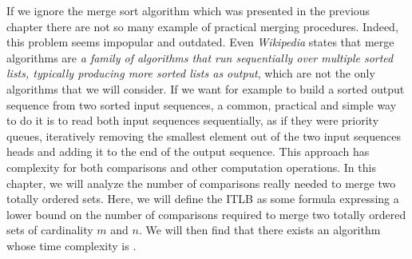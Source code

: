 \label{tree:merging:intro}

If we ignore the merge sort algorithm which was presented in
the previous chapter there are not so many example of practical merging
procedures. Indeed, this problem seems impopular and outdated. Even
\emph{Wikipedia} states that merge algorithms are \emph{a family of algorithms
that run sequentially over multiple sorted lists, typically producing more
sorted lists as output}, which are not the only algorithms that we will
consider. If we want for example to build a sorted output sequence from two
sorted input sequences, a common, practical and simple way to do it is to read
both input sequences sequentially, as if they were priority queues, iteratively
removing the smallest element out of the two input sequences heads and adding
it to the end of the output sequence. This approach has  complexity for
both comparisons and other computation operations. In this chapter, we will
analyze the number of comparisons really needed to merge two totally
ordered sets. Here, we will define the ITLB as some formula expressing a lower
bound on the number of comparisons required to merge two totally ordered sets
of cardinality $m$ and $n$. We will then find that there exists an algorithm
whose time complexity is .

